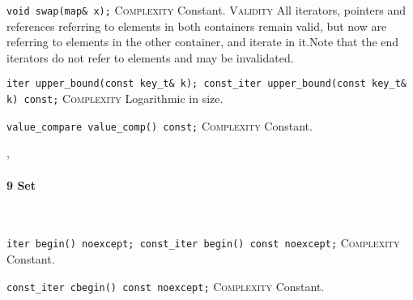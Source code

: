 \noindent{}\hspace*{0.25em}\lstinline[basicstyle=\ttfamily\color{cgreen}]{void swap(map& x);} \textsc{Complexity} Constant. \textsc{Validity} All iterators, pointers and references referring to elements in both containers remain valid, but now are referring to elements in the other container, and iterate in it.Note that the end iterators do not refer to elements and may be invalidated.\\\vspace{-0.6em}

\noindent{}\hspace*{0.25em}\lstinline[basicstyle=\ttfamily\color{clime}]{iter upper_bound(const key_t& k); const_iter upper_bound(const key_t& k) const;} \textsc{Complexity} Logarithmic in size.\\\vspace{-0.6em}

\noindent{}\hspace*{0.25em}\lstinline[basicstyle=\ttfamily\color{cgreen}]{value_compare value_comp() const;} \textsc{Complexity} Constant.\\\vspace{-0.6em}


\sep
{}
\paragraph{9 Set}\mbox{}\vspace{0.5em}\\
\noindent{}\hspace*{0.25em}\lstinline[basicstyle=\ttfamily\color{cgreen}]{iter begin() noexcept; const_iter begin() const noexcept;} \textsc{Complexity} Constant.\\\vspace{-0.6em}

\noindent{}\hspace*{0.25em}\lstinline[basicstyle=\ttfamily\color{cgreen}]{const_iter cbegin() const noexcept;} \textsc{Complexity} Constant.\\\vspace{-0.6em}

